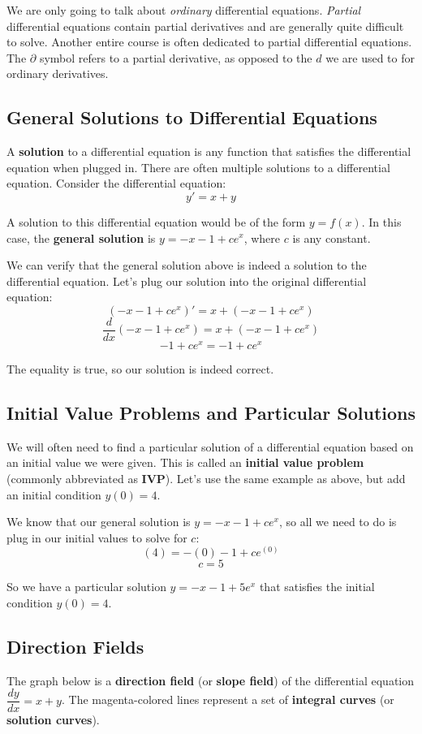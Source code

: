 We are only going to talk about \textit{ordinary} differential equations. \textit{Partial} differential equations contain partial derivatives and are generally quite difficult to solve. Another entire course is often dedicated to partial differential equations. The $\partial$ symbol refers to a partial derivative, as opposed to the $d$ we are used to for ordinary derivatives.

\subsection{General Solutions to Differential Equations}
A \textbf{solution} to a differential equation is any function that satisfies the differential equation when plugged in. There are often multiple solutions to a differential equation. Consider the differential equation:
$$y' = x + y$$

A solution to this differential equation would be of the form $y = f(x)$. In this case, the \textbf{general solution} is $y = -x - 1 + ce^{x}$, where $c$ is any constant.

We can verify that the general solution above is indeed a solution to the differential equation. Let's plug our solution into the original differential equation:
$$(-x - 1 + ce^{x})' = x + (-x - 1 + ce^{x})$$
$$\frac{d}{dx}(-x - 1 + ce^{x}) = x + (-x - 1 + ce^{x})$$
$$-1 + ce^{x} = -1 + ce^{x}$$

The equality is true, so our solution is indeed correct.

\subsection{Initial Value Problems and Particular Solutions}
We will often need to find a particular solution of a differential equation based on an initial value we were given. This is called an \textbf{initial value problem} (commonly abbreviated as \textbf{IVP}). Let's use the same example as above, but add an initial condition $y(0) = 4$.

We know that our general solution is $y = -x - 1 + ce^{x}$, so all we need to do is plug in our initial values to solve for $c$:
$$(4) = -(0) - 1 + ce^{(0)}$$
$$c = 5$$

So we have a particular solution $y = -x - 1 + 5e^{x}$ that satisfies the initial condition $y(0) = 4$.

\subsection{Direction Fields}
The graph below is a \textbf{direction field} (or \textbf{slope field}) of the differential equation $\dfrac{dy}{dx} = x + y$. The magenta-colored lines represent a set of \textbf{integral curves} (or \textbf{solution curves}).

